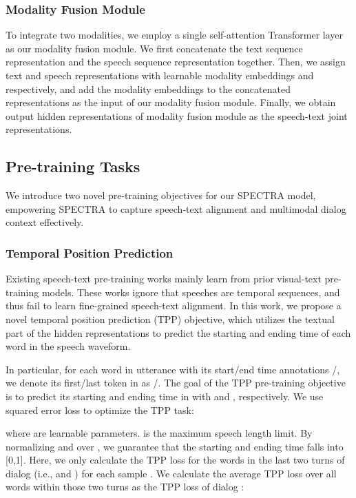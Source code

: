 \documentclass[11pt]{article}
\begin{document}
\subsubsection{Modality Fusion Module}
To integrate two modalities, we employ a single self-attention Transformer layer as our modality fusion module. We first concatenate  the text sequence representation  and the speech sequence representation  together.
Then, we assign text and speech representations with learnable modality embeddings  and  respectively, and add the modality embeddings to the concatenated representations as the input of our modality fusion module. Finally, we obtain output hidden representations of modality fusion module  as the speech-text joint representations.

\subsection{Pre-training Tasks}
We introduce two novel pre-training objectives for our SPECTRA model, empowering SPECTRA to capture speech-text alignment and multimodal dialog context effectively. 


\subsubsection{Temporal Position Prediction}
Existing speech-text pre-training works mainly learn from prior visual-text pre-training models. 
These works ignore that speeches are temporal sequences, and thus fail to learn fine-grained speech-text alignment. 
In this work, we propose a novel temporal position prediction (TPP) objective, which utilizes the textual part of the hidden representations  to predict the starting and ending time of each word in the speech waveform. 


In particular, for each word  in utterance  with its start/end time annotations /, we denote its first/last token in  as /. 
The goal of the TPP pre-training objective is to predict its starting and ending time in  with  and , respectively. We use squared error loss to optimize the TPP task:

where  are learnable parameters.  is the maximum speech length limit. By normalizing   and  over , we guarantee that the starting and ending time falls into [0,1].
Here, we only calculate the TPP loss for the words in the last two turns of dialog (i.e.,  and ) for each sample . We calculate the average TPP loss over all words within those two turns as the TPP loss of dialog :
\end{document}
